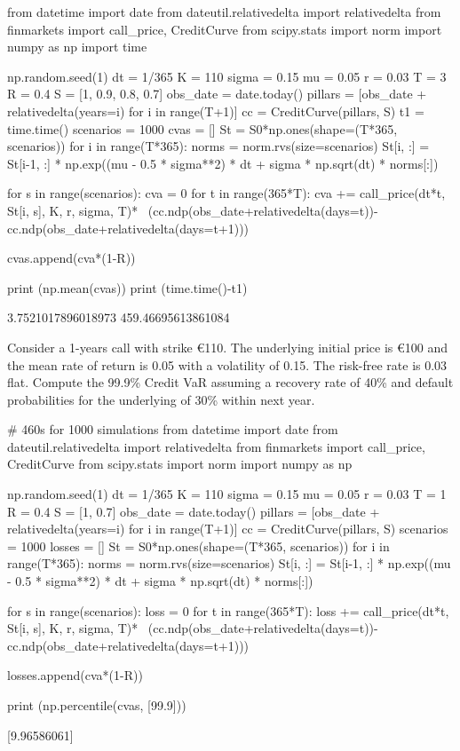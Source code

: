\begin{ipython}
from datetime import date
from dateutil.relativedelta import relativedelta
from finmarkets import call_price, CreditCurve
from scipy.stats import norm
import numpy as np
import time

np.random.seed(1)
dt = 1/365
K = 110
sigma = 0.15
mu = 0.05
r = 0.03
T = 3
R = 0.4
S = [1, 0.9, 0.8, 0.7]
obs_date = date.today()
pillars = [obs_date + relativedelta(years=i) for i in range(T+1)]
cc = CreditCurve(pillars, S)
t1 = time.time()
scenarios = 1000
cvas = []
St = S0*np.ones(shape=(T*365, scenarios))
for i in range(T*365):
    norms = norm.rvs(size=scenarios)
    St[i, :] = St[i-1, :] * np.exp((mu - 0.5 * sigma**2) * dt + sigma
        * np.sqrt(dt) * norms[:])

for s in range(scenarios):
    cva = 0
    for t in range(365*T):
        cva += call_price(dt*t, St[i, s], K, r, sigma, T)* \
            (cc.ndp(obs_date+relativedelta(days=t))-
             cc.ndp(obs_date+relativedelta(days=t+1)))

        cvas.append(cva*(1-R))

print (np.mean(cvas))
print (time.time()-t1)

3.7521017896018973
459.46695613861084
\end{ipython}

\begin{question}
Consider a 1-years call with strike \euro{110}. The underlying initial price is \euro{100} and the mean rate of return is 0.05 with a volatility of 0.15. The risk-free rate is 0.03 flat.
Compute the 99.9\% Credit VaR assuming a recovery rate of 40\% and default probabilities for the underlying of 30\% within next year.
\end{question}

\begin{solution}
\end{solution}

\begin{ipython}
# 460s for 1000 simulations
from datetime import date
from dateutil.relativedelta import relativedelta
from finmarkets import call_price, CreditCurve
from scipy.stats import norm
import numpy as np

np.random.seed(1)
dt = 1/365
K = 110
sigma = 0.15
mu = 0.05
r = 0.03
T = 1
R = 0.4
S = [1, 0.7]
obs_date = date.today()
pillars = [obs_date + relativedelta(years=i) for i in range(T+1)]
cc = CreditCurve(pillars, S)
scenarios = 1000
losses = []
St = S0*np.ones(shape=(T*365, scenarios))
for i in range(T*365):
    norms = norm.rvs(size=scenarios)
    St[i, :] = St[i-1, :] * np.exp((mu - 0.5 * sigma**2) * dt + sigma
        * np.sqrt(dt) * norms[:])

for s in range(scenarios):
    loss = 0
    for t in range(365*T):
        loss += call_price(dt*t, St[i, s], K, r, sigma, T)* \
            (cc.ndp(obs_date+relativedelta(days=t))-
             cc.ndp(obs_date+relativedelta(days=t+1)))

        losses.append(cva*(1-R))

print (np.percentile(cvas, [99.9]))

[9.96586061]
\end{ipython}

